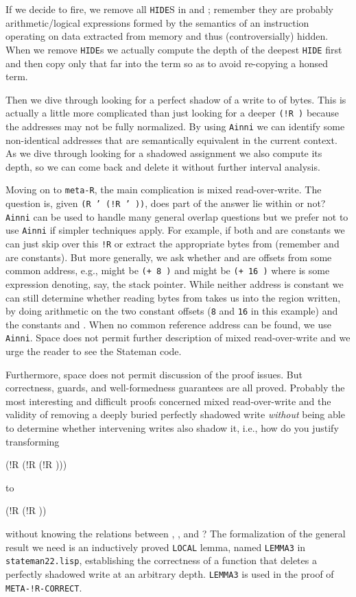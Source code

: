 \documentclass[submission,copyright,creativecommons]{eptcs}
\newcommand{\ptt}[1]{\tt{#1}}
\begin{document}
If we decide to fire, we remove all {\ptt{HIDE}}S in  and ; remember they are
probably arithmetic/logical expressions formed by the semantics of an
instruction operating on data extracted from memory and thus
(controversially) hidden.  When we remove {\ptt{HIDE}}s we actually compute
the depth of the deepest {\ptt{HIDE}} first and then copy only that far into
the term so as to avoid re-copying a honsed term.

Then we dive through  looking for a perfect shadow of a write to  of
 bytes.  This is actually a little more complicated than just looking for
a deeper {\ptt{(!R   )}} because the addresses may not be fully
normalized.  By using {\ptt{Ainni}} we can identify some non-identical
addresses that are semantically equivalent in the current context.  As we
dive through  looking for a shadowed assignment we also compute its
depth, so we can come back and delete it without further interval analysis.

Moving on to {\ptt{meta-R}}, the main complication is mixed read-over-write.
The question is, given {\ptt{(R  ' (!R  '  ))}}, does part of the
answer lie within  or not?  {\ptt{Ainni}} can be used to handle many
general overlap questions but we prefer not to use {\ptt{Ainni}} if simpler
techniques apply.  For example, if both  and  are constants we can just
skip over this {\ptt{!R}} or extract the appropriate bytes from  (remember
 and  are constants).  But more generally, we ask whether  and 
are offsets from some common address, e.g.,  might be {\ptt{(+ 8 )}}
and  might be {\ptt{(+ 16 )}} where  is some expression denoting,
say, the stack pointer.  While neither address is constant we can still
determine whether reading  bytes from  takes us into the region
written, by doing arithmetic on the two constant offsets ({\ptt{8}} and
{\ptt{16}} in this example) and the constants  and .  When no common
reference address can be found, we use {\ptt{Ainni}}.  Space does not permit
further description of mixed read-over-write and we urge the reader to see
the Stateman code.

Furthermore, space does not permit discussion of the proof issues.  But
correctness, guards, and well-formedness guarantees are all proved.
Probably the most interesting and difficult proofs concerned mixed
read-over-write and the validity of removing a deeply buried perfectly
shadowed write {\em{without}} being able to determine whether intervening
writes also shadow it, i.e., how do you justify transforming
\begin{acl2p}
(!R   
    (!R   
        (!R    )))
\end{acl2p}
to
\begin{acl2p}
(!R   
    (!R    ))
\end{acl2p}
without knowing the relations between , ,  and ?  The
formalization of the general result we need is an inductively proved
{\ptt{LOCAL}} lemma, named {\ptt{LEMMA3}} in {\ptt{stateman22.lisp}},
establishing the correctness of a function that deletes a perfectly shadowed
write at an arbitrary depth.  {\ptt{LEMMA3}} is used in the proof of
{\ptt{META-!R-CORRECT}}.
\end{document}
